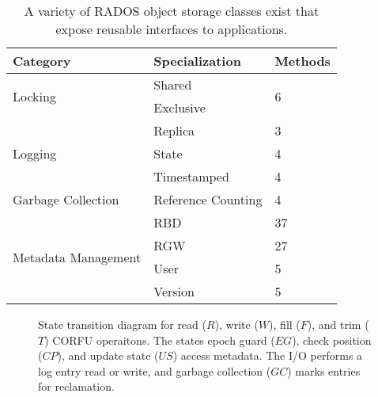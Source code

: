 \documentclass[10pt,twocolumn]{article}
\begin{document}
\begin{table}
\begin{tabular}{|l|l|l|}
\hline
Category & Specialization & Methods \\ \hline
\multirow{2}{*}{Locking} & Shared & \multirow{2}{*}{6} \\
                         & Exclusive & \\ \hline
\multirow{3}{*}{Logging} & Replica & 3 \\
                         & State & 4 \\
                         & Timestamped & 4 \\ \hline
Garbage Collection & Reference Counting & 4 \\ \hline
\multirow{4}{*}{Metadata Management} & RBD & 37 \\
 & RGW & 27 \\
 & User & 5 \\
 & Version & 5 \\ \hline
\end{tabular}
\caption{A variety of RADOS object storage classes exist that expose reusable interfaces to applications.}
\label{tab:objclasses}
\end{table}


\begin{figure}
\centering
{}
\caption{State transition diagram for read ($R$), write ($W$), fill ($F$), and
trim ($T$) CORFU operaitons. The states epoch guard ($EG$), check position ($CP$),
and update state ($US$) access metadata. The I/O performs a log entry read or
write, and garbage collection ($GC$) marks entries for reclamation.}
\end{figure}
\end{document}

